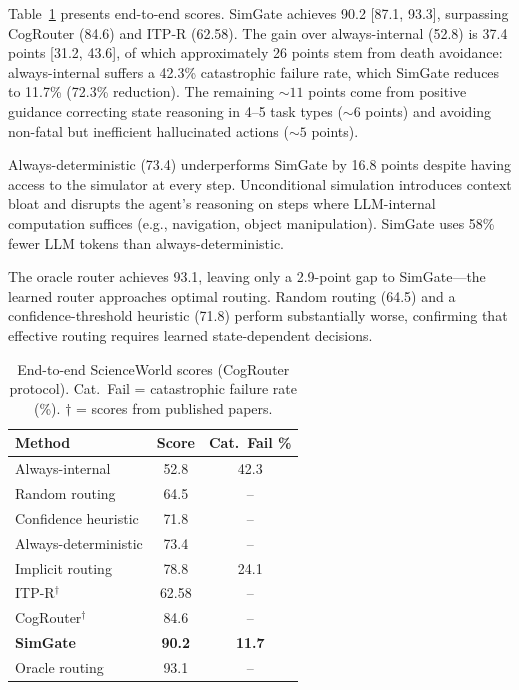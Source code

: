 \documentclass[11pt,a4paper]{article}
\begin{document}
Table~\ref{tab:main} presents end-to-end scores.
SimGate achieves 90.2 [87.1, 93.3], surpassing CogRouter (84.6) and ITP-R (62.58).
The gain over always-internal (52.8) is 37.4 points [31.2, 43.6], of which approximately 26 points stem from death avoidance: always-internal suffers a 42.3\% catastrophic failure rate, which SimGate reduces to 11.7\% (72.3\% reduction).
The remaining ${\sim}11$ points come from positive guidance correcting state reasoning in 4--5 task types (${\sim}6$ points) and avoiding non-fatal but inefficient hallucinated actions (${\sim}5$ points).

Always-deterministic (73.4) underperforms SimGate by 16.8 points despite having access to the simulator at every step.
Unconditional simulation introduces context bloat and disrupts the agent's reasoning on steps where LLM-internal computation suffices (e.g., navigation, object manipulation).
SimGate uses 58\% fewer LLM tokens than always-deterministic.

The oracle router achieves 93.1, leaving only a 2.9-point gap to SimGate---the learned router approaches optimal routing.
Random routing (64.5) and a confidence-threshold heuristic (71.8) perform substantially worse, confirming that effective routing requires learned state-dependent decisions.

\begin{table}[t]
\centering
\small
\begin{tabular}{lcc}
\toprule
\textbf{Method} & \textbf{Score} & \textbf{Cat.\ Fail \%} \\
\midrule
Always-internal & 52.8 & 42.3 \\
Random routing & 64.5 & -- \\
Confidence heuristic & 71.8 & -- \\
Always-deterministic & 73.4 & -- \\
Implicit routing & 78.8 & 24.1 \\
ITP-R$^\dagger$ & 62.58 & -- \\
CogRouter$^\dagger$ & 84.6 & -- \\
\midrule
\textbf{SimGate} & \textbf{90.2} & \textbf{11.7} \\
Oracle routing & 93.1 & -- \\
\bottomrule
\end{tabular}
\caption{End-to-end ScienceWorld scores (CogRouter protocol). Cat.\ Fail = catastrophic failure rate (\%). $\dagger$ = scores from published papers.}
\label{tab:main}
\end{table}
\end{document}
